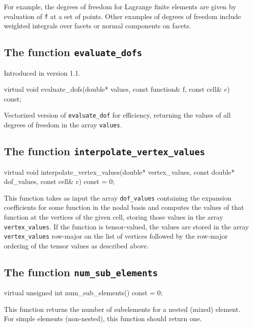 For example, the degrees of freedom for Lagrange finite elements are
given by evaluation of \texttt{f} at a set of points. Other examples
of degrees of freedom include weighted integrals over facets or normal
components on facets.

\subsection{The function \texttt{evaluate\_dofs}}
Introduced in version 1.1.

\begin{code}
virtual void evaluate_dofs(double* values,
                           const function& f,
                           const cell& c) const;
\end{code}

Vectorized version of \texttt{evaluate\_dof} for efficiency,
returning the values of all degrees of freedom in the array \texttt{values}.

\subsection{The function \texttt{interpolate\_vertex\_values}}

\begin{code}
virtual void
interpolate_vertex_values(double* vertex_values,
                          const double* dof_values,
                          const cell& c) const = 0;
\end{code}

This function takes as input the array \texttt{dof\_values} containing
the expansion coefficients for some function in the nodal basis and
computes the values of that function at the vertices of the given
cell, storing those values in the array \texttt{vertex\_values}. If
the function is tensor-valued, the values are stored in the array
\texttt{vertex\_values} row-major on the list of vertices followed by the
row-major ordering of the tensor values as described above.

\subsection{The function \texttt{num\_sub\_elements}}

\begin{code}
virtual unsigned int num_sub_elements() const = 0;
\end{code}

This function returns the number of subelements for a nested (mixed)
element. For simple elements (non-nested), this function should return
one.

